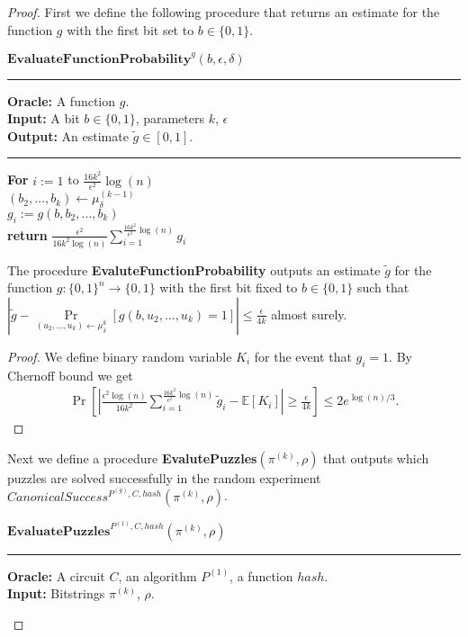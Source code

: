 \begin{proof}
%
First we define the following procedure that returns an estimate for the function $g$ with the first bit set to $b \in \{0,1\}$.
%
\begin{codeblock}
  $\textbf{EvaluateFunctionProbability}^{g}(b, \epsilon, \delta)$
  \medskip
  \hrule
  \medskip
  \textbf{Oracle:} A function $g$.\\
  \textbf{Input:} A bit $b \in \{0,1\}$, parameters $k$, $\epsilon$ \\
  \textbf{Output:} An estimate $\widetilde{g} \in \left[0,1\right]$.
  \medskip\hrule\medskip
  \textbf{For} $i:=1$ to $\frac{16k^2}{\epsilon^2}\log(n)$ \Do \\
  \IndI $(b_2, \dots, b_k) \leftarrow \mu_{\delta}^{(k-1)}$ \\
  \IndI $g_i := g(b,b_2, \dots, b_k)$ \then \\
  \textbf{return} $\frac{\epsilon^2}{16k^2\log(n)} \sum_{i=1}^{\frac{16k^2}{\epsilon^2}\log(n)} g_i$
\end{codeblock}
%
\begin{lemma}
  \label{lemma:estimate_of_g}
  The procedure \textbf{EvaluteFunctionProbability} outputs an estimate $\widetilde{g}$ for the function $g: \{0,1\}^{n} \rightarrow \{0,1\}$ with the first bit fixed to $b \in \{0,1\}$
  such that $| \widetilde{g} - \underset{(u_2,\dots,u_k) \leftarrow \mu_{\delta}^{k}}{\Pr}\left[g(b,u_2, \dots, u_k) = 1\right] | \leq \frac{\epsilon}{4k}$ almost surely.
\end{lemma}
%
\begin{proof}
We define binary random variable $K_i$ for the event that $g_i = 1$.
By Chernoff bound we get
\begin{align*}
  \underset{}{\Pr}\left[\left|\frac{\epsilon^2 \log(n)}{16k^2} \sum_{i=1}^{\frac{16k^2}{\epsilon^2}\log(n)} \widetilde{g}_i - \mathbb{E}[K_i]\right| \geq \frac{\epsilon}{4k}  \right] \leq 2e^{\log(n)/3}.
\end{align*}
\end{proof}
%
Next we define a procedure \textbf{EvalutePuzzles}$(\pi^{(k)}, \rho)$ that outputs which puzzles are solved successfully
in the random experiment $CanonicalSuccess^{P^{(g)}, C, hash}(\pi^{(k)}, \rho)$.
%
\begin{codeblock}
  $\textbf{EvaluatePuzzles}^{P^{(1)}, C, hash}(\pi^{(k)}, \rho)$
  \medskip \hrule \medskip
  \textbf{Oracle:}  A circuit $C$, an algorithm $P^{(1)}$, a function $hash$.\\
  \textbf{Input:} Bitstrings $\pi^{(k)}$, $\rho$.\\

\end{codeblock}
\end{proof}

